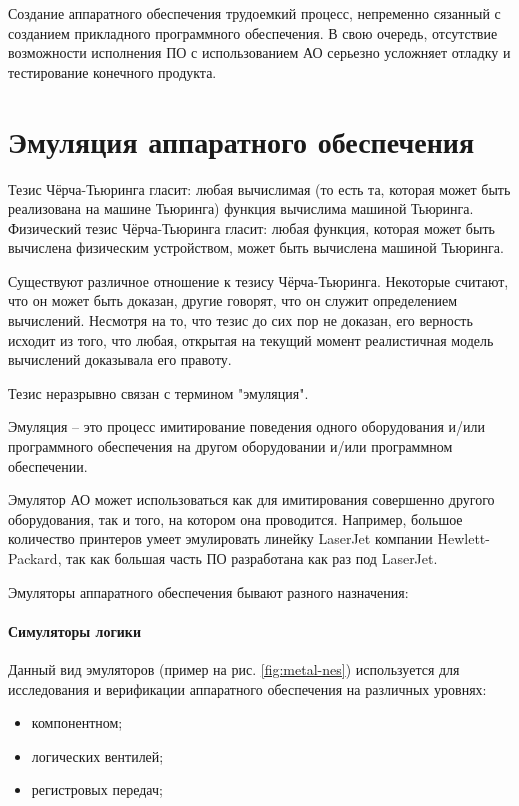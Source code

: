 Создание аппаратного обеспечения трудоемкий процесс, непременно сязанный с созданием прикладного программного обеспечения.
В свою очередь, отсутствие возможности исполнения ПО с использованием АО серьезно усложняет отладку и тестирование конечного продукта.

\section{Эмуляция аппаратного обеспечения}\label{sec:ch1/sec1}

Тезис Чёрча-Тьюринга гласит: любая вычислимая (то есть та,
которая может быть реализована на машине Тьюринга) функция вычислима машиной Тьюринга.
Физический тезис Чёрча-Тьюринга гласит: любая функция, которая может быть вычислена физическим устройством, может быть вычислена машиной Тьюринга.

Существуют различное отношение к тезису Чёрча-Тьюринга.
Некоторые считают, что он может быть доказан, другие говорят, что он служит определением вычислений.
Несмотря на то, что тезис до сих пор не доказан, его верность исходит из того, что любая, открытая на текущий момент
реалистичная модель вычислений доказывала его правоту.

Тезис неразрывно связан с термином "эмуляция".

Эмуляция -- это процесс имитирование поведения одного оборудования и/или программного обеспечения
на другом оборудовании и/или программном обеспечении.

Эмулятор АО может использоваться как для имитирования совершенно другого оборудования, так и того, на котором она проводится.
Например, большое количество принтеров умеет эмулировать линейку LaserJet компании Hewlett-Packard,
так как большая часть ПО разработана как раз под LaserJet.

Эмуляторы аппаратного обеспечения бывают разного назначения:

\paragraph{Симуляторы логики}\label{logic-sim}

Данный вид эмуляторов (пример на рис. \ref{fig:metal-nes})
используется для исследования и верификации аппаратного обеспечения на различных уровнях:
\begin{itemize}
    \item компонентном;
    \item логических вентилей;
    \item регистровых передач;
\end{itemize}


